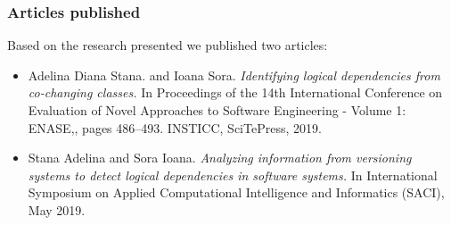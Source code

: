 \documentclass{beamer}
\begin{document}
 \begin{frame}
\frametitle{Articles published}
Based on the research presented we published two articles:
\begin{itemize}
\item Adelina Diana Stana. and Ioana Sora.  \textit{Identifying logical dependencies from
co-changing classes.} In Proceedings of the 14th International Conference on
Evaluation of Novel Approaches to Software Engineering - Volume 1: ENASE,,
pages 486–493. INSTICC, SciTePress, 2019.


\item Stana Adelina and Sora Ioana. \textit{Analyzing information from versioning systems
to detect logical dependencies in software systems.} In International Symposium
on Applied Computational Intelligence and Informatics (SACI), May 2019.
\end{itemize}
\end{frame}

\end{document}

